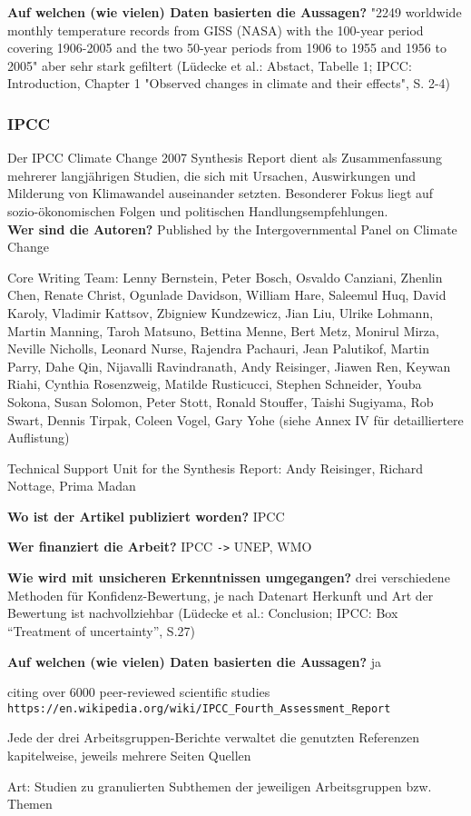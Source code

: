 \documentclass{article}
\begin{document}
\textbf{Auf welchen (wie vielen) Daten basierten die Aussagen?}
"2249 worldwide monthly temperature records from GISS (NASA) with the 100-year
period covering 1906-2005 and the two 50-year periods from 1906 to 1955
and 1956 to 2005" aber sehr stark gefiltert
(Lüdecke et al.: Abstact, Tabelle 1; IPCC: Introduction, Chapter 1 "Observed
changes in climate and their effects", S. 2-4)


\subsubsection*{IPCC}
Der IPCC Climate Change 2007 Synthesis Report dient als Zusammenfassung mehrerer langjährigen Studien, die sich mit Ursachen, Auswirkungen und Milderung von Klimawandel auseinander setzten.
Besonderer Fokus liegt auf sozio-ökonomischen Folgen und politischen Handlungsempfehlungen.
\\

\textbf{Wer sind die Autoren?}
Published by the Intergovernmental Panel on Climate Change

Core Writing Team:
Lenny Bernstein, Peter Bosch, Osvaldo Canziani, Zhenlin Chen, Renate Christ, Ogunlade Davidson,
William Hare, Saleemul Huq, David Karoly, Vladimir Kattsov, Zbigniew Kundzewicz, Jian Liu, Ulrike
Lohmann, Martin Manning, Taroh Matsuno, Bettina Menne, Bert Metz, Monirul Mirza, Neville Nicholls,
Leonard Nurse, Rajendra Pachauri, Jean Palutikof, Martin Parry, Dahe Qin, Nijavalli Ravindranath,
Andy Reisinger, Jiawen Ren, Keywan Riahi, Cynthia Rosenzweig, Matilde Rusticucci, Stephen Schneider, Youba Sokona, Susan Solomon, Peter Stott, Ronald Stouffer, Taishi Sugiyama, Rob Swart,
Dennis Tirpak, Coleen Vogel, Gary Yohe (siehe Annex IV für detailliertere Auflistung)

Technical Support Unit for the Synthesis Report:
Andy Reisinger, Richard Nottage, Prima Madan

\textbf{Wo ist der Artikel publiziert worden?}
IPCC

\textbf{Wer finanziert die Arbeit?}
IPCC \verb|->| UNEP, WMO

\textbf{Wie wird mit unsicheren Erkenntnissen umgegangen?}
drei verschiedene Methoden für Konfidenz-Bewertung, je nach Datenart
Herkunft und Art der Bewertung ist nachvollziehbar
(Lüdecke et al.: Conclusion; IPCC: Box “Treatment of uncertainty”, S.27)

\textbf{Auf welchen (wie vielen) Daten basierten die Aussagen?}
ja

citing over 6000 peer-reviewed scientific studies 
\\\verb|https://en.wikipedia.org/wiki/IPCC_Fourth_Assessment_Report|

Jede der drei Arbeitsgruppen-Berichte verwaltet die genutzten Referenzen kapitelweise, jeweils mehrere Seiten Quellen

Art: Studien zu granulierten Subthemen der jeweiligen Arbeitsgruppen bzw. Themen
\end{document}
